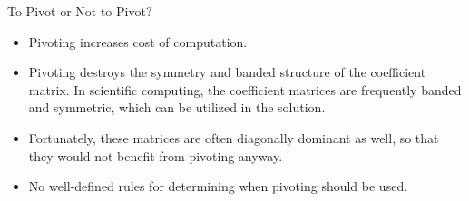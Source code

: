 \documentclass{beamer}
\begin{document}
\begin{frame}{To Pivot or Not to Pivot?}
\begin{itemize}
\item Pivoting  increases cost of computation.
\item  Pivoting destroys the symmetry and banded structure of the coefficient matrix. In scientific computing,  the coefficient matrices are frequently banded and symmetric, which can be  utilized in the solution. 
\item Fortunately, these matrices are often diagonally dominant as well, so that they would not benefit from pivoting anyway.
\item No well-defined rules for determining when pivoting should be used.
\end{itemize}

\end{frame}
\end{document}
